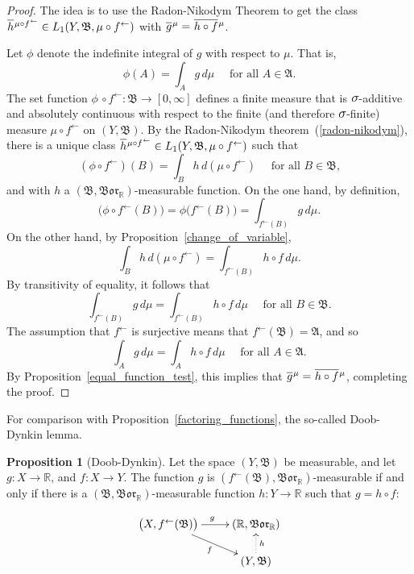 \documentclass[
twoside=true,
paper=letter,
fontsize=9pt,
pagesize=auto,
leqno,
openany,
headsepline,
overfullrule,
]{scrbook}
\theoremstyle{plain}
\theoremstyle{plain}
\theoremstyle{definition}
\theoremstyle{bfnoteitalic}
\newtheorem{propboldnote}[thm]{Proposition}
\theoremstyle{bfnoteroman}
\newcommand{\sigalg}[1]{\mathfrak{#1}}
\newcommand{\borel}{\mathfrak{Bor}}
\newcommand{\textsigma}{\hbox{\large{$\sigma$}}\kern-1pt}
\newcommand{\preimage}[1]{#1^{\leftarrow}}
\newcommand{\R}{\mathbb{R}}
\newcommand{\sigmaalgebra}{\sigalg{A}}
\newcommand{\sigmaalgebraii}{\sigalg{B}}
\newcommand{\function}{f}
\newcommand{\functionii}{g}
\newcommand{\functioniii}{h}
\newcommand{\measurespace}{X}
\newcommand{\measurespaceii}{Y}
\newcommand{\measure}{\mu}
\newcommand*\xbar[1]{%
   \hbox{%
     \vbox{%
       \hrule height 0.4pt %
       \kern0.4ex%
       \hbox{%
         \ensuremath{#1}%
       }%
     }%
   }%
}
\newcommand{\lebclass}[1]{\hspace{.5pt}\xbar{#1}\hspace{0.5pt}}
\newcommand{\ellclass}[2]{\lebclass{#1}^{#2}}
\begin{document}
\begin{proof}
The idea is to use the Radon-Nikodym Theorem to get the class 
$\ellclass{h}{\measure\circ\preimage{f}}\in L_1 (\measurespaceii, \sigmaalgebraii, \measure\circ\preimage{f})$ with 
$\ellclass{g}{\measure}  
= 
\ellclass{h\circ f}{\measure}$.

Let $\phi$ denote the indefinite integral of $g$ with respect to 
$\measure$. That is,
\[
\phi(A)=\int_A g\,d\measure
\quad\text{ for all $A \in \sigmaalgebra$.}
\]
The set function 
$\phi\, \circ \preimage{f}:\sigmaalgebraii \to [0,\infty]$
defines a finite measure that is $\textsigma$-additive and absolutely continuous with respect to the finite (and therefore $\textsigma$-finite) measure
$\measure\circ\preimage{f}$
on $(\measurespaceii, \sigmaalgebraii)$.
By the Radon-Nikodym theorem~(\ref{radon-nikodym}), there is a unique class
$\ellclass{h}{\measure\circ\preimage{f}}\in L_1(\measurespaceii, \sigmaalgebraii, \measure\circ\preimage{f})$
such that
\[
(\phi\circ\preimage{f}) (B)
=
\int_B h \, d(\measure\circ\preimage{f})
\quad\text{ for all $B\in\sigmaalgebraii$,}
\]
and with $h$ a $(\sigmaalgebraii, \borel_\R)$\hyp{}measurable function.
On the one hand, by definition,
\[
\bigl(\phi\circ\preimage{f} (B)\bigr)
=
\phi\bigl(\preimage{f}(B)\bigr) 
= 
\int_{\preimage{f}(B)} g\, d\measure .
\]
On the other hand, by Proposition~\ref{change_of_variable},
\[
\int_B h \, d(\measure\circ\preimage{f})
=
\int_{\preimage{f}(B)} h\circ f \, d\measure .
\]
By transitivity of equality, it follows that
\[
\int_{\preimage{f}(B)} g\, d\measure
=
\int_{\preimage{f}(B)} h\circ f \, d\measure
\quad\text{ for all $B\in\sigmaalgebraii$.}
\]
The assumption that $\preimage{f}$ is surjective means that
$\preimage{f}(\sigmaalgebraii)=\sigmaalgebra$, and so
\[
\int_{A} g\, d\measure
=
\int_{A} h\circ f \, d\measure
\quad\text{ for all $A\in\sigmaalgebra$.}
\]
By Proposition~\ref{equal_function_test}, this implies that
$\ellclass{g}{\measure}  
= 
\ellclass{h\circ f}{\measure}$,
completing the proof.
\end{proof}


For comparison with Proposition~\ref{factoring_functions}, the so-called Doob-Dynkin lemma.

\begin{propboldnote}[Doob-Dynkin]\label{doob_dynkin}
Let the space $(\measurespaceii,\sigmaalgebraii)$ be measurable,
and let 
$\functionii:\measurespace\to\R$,
and
$\function:\measurespace\to\measurespaceii$.
The function $\functionii$ is
$(\preimage{\function}(\sigmaalgebraii),\borel_\R)$\hyp{}measurable if and only if there is a 
$(\sigmaalgebraii,\borel_\R)$\hyp{}measurable function
$\functioniii:\measurespaceii\to\R$ such that 
$\functionii=\functioniii\circ\function$:
\end{propboldnote}
\[
\xymatrix@R=16pt{
\bigl(\measurespace,\preimage{\function}(\sigmaalgebraii)\bigr) 
\ar[r]^\functionii
\ar[dr]_\function
& (\R,\borel_\R) \\
 & (\measurespaceii,\sigmaalgebraii) \ar@{.>}[u]_{\functioniii}\\
}
\]
\end{document}
